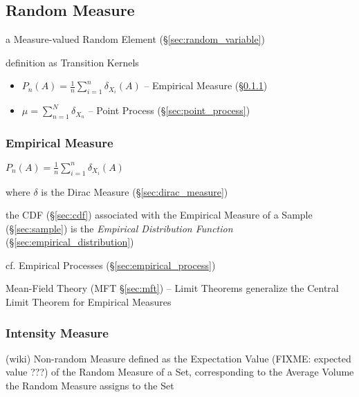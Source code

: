 \subsection{Random Measure}\label{sec:random_measure}

a Measure-valued Random Element (\S\ref{sec:random_variable})

definition as Transition Kernels

\begin{itemize}
  \item $P_n(A) = \frac{1}{n}\sum_{i=1}^n \delta_{X_i}(A)$ --
    Empirical Measure (\S\ref{sec:empirical_measure})
  \item $\mu = \sum_{n=1}^N \delta_{X_n}$ -- Point Process
    (\S\ref{sec:point_process})
\end{itemize}



\subsubsection{Empirical Measure}\label{sec:empirical_measure}

$P_n(A) = \frac{1}{n}\sum_{i=1}^n \delta_{X_i}(A)$

where $\delta$ is the Dirac Measure (\S\ref{sec:dirac_measure})

the CDF (\S\ref{sec:cdf}) associated with the Empirical Measure of a Sample
(\S\ref{sec:sample}) is the \emph{Empirical Distribution Function}
(\S\ref{sec:empirical_distribution})

cf. Empirical Processes (\S\ref{sec:empirical_process})

\fist Mean-Field Theory (MFT \S\ref{sec:mft}) -- Limit Theorems generalize the
Central Limit Theorem for Empirical Measures



\subsubsection{Intensity Measure}\label{sec:intensity_measure}

(wiki) Non-random Measure defined as the Expectation Value (FIXME: expected
value ???) of the Random Measure of a Set, corresponding to the Average Volume
the Random Measure assigns to the Set



